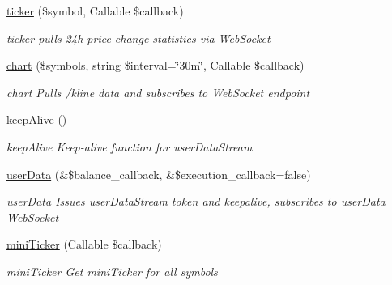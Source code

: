 \begin{DoxyCompactItemize}
\hyperlink{classBinance_1_1API_a0ef50663f1cca6d48620d458fd26ee28}{ticker} (\$symbol, Callable \$callback)
\begin{DoxyCompactList}\small\item\em ticker pulls 24h price change statistics via Web\-Socket \end{DoxyCompactList}\item 
\hyperlink{classBinance_1_1API_a1e0a2985b3ff7e4e9c1155a8e46caa5c}{chart} (\$symbols, string \$interval=\char`\"{}30m\char`\"{}, Callable \$callback)
\begin{DoxyCompactList}\small\item\em chart Pulls /kline data and subscribes to  Web\-Socket endpoint \end{DoxyCompactList}\item 
\hyperlink{classBinance_1_1API_a2a29ca9ab18d04ff2e42aa6e5e0ce312}{keep\-Alive} ()
\begin{DoxyCompactList}\small\item\em keep\-Alive Keep-\/alive function for user\-Data\-Stream \end{DoxyCompactList}\item 
\hyperlink{classBinance_1_1API_af033a40a6a86ad422c58d67dc57bb0fd}{user\-Data} (\&\$balance\-\_\-callback, \&\$execution\-\_\-callback=false)
\begin{DoxyCompactList}\small\item\em user\-Data Issues user\-Data\-Stream token and keepalive, subscribes to user\-Data Web\-Socket \end{DoxyCompactList}\item 
\hyperlink{classBinance_1_1API_a9790abae353fbde93bc42069c672f3e2}{mini\-Ticker} (Callable \$callback)
\begin{DoxyCompactList}\small\item\em mini\-Ticker Get mini\-Ticker for all symbols \end{DoxyCompactList}\end{DoxyCompactItemize}
